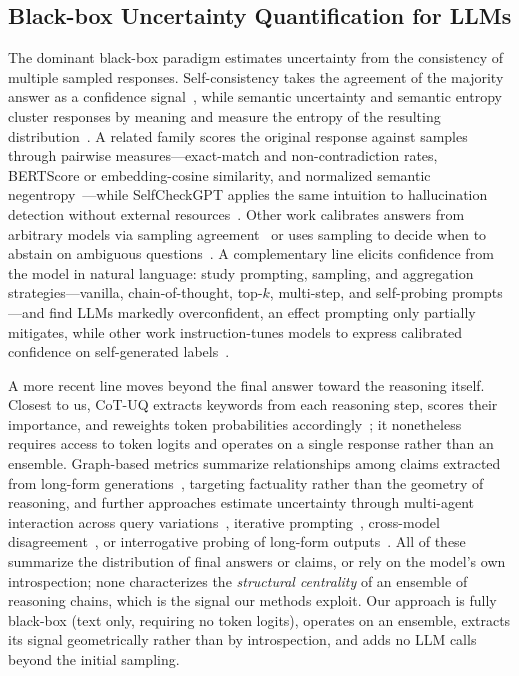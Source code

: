 \documentclass[11pt]{article}
\begin{document}
\subsection{Black-box Uncertainty Quantification for LLMs}
The dominant black-box paradigm estimates uncertainty from the consistency of
multiple sampled responses. Self-consistency takes the agreement of the majority
answer as a confidence signal~\citep{wang2023selfconsistency}, while semantic
uncertainty and semantic entropy cluster responses by meaning and measure the
entropy of the resulting distribution~\citep{kuhn2023semantic, farquhar2024detecting}.
A related family scores the original response against samples through pairwise
measures---exact-match and non-contradiction rates, BERTScore or embedding-cosine
similarity, and normalized semantic negentropy~\citep{lin2023generating}---while
SelfCheckGPT applies the same intuition to hallucination detection without
external resources~\citep{manakul2023selfcheckgpt}. Other work calibrates answers
from arbitrary models via sampling agreement~\citep{chen2024quantifying} or uses
sampling to decide when to abstain on ambiguous
questions~\citep{stelmakh2022selectively}. A complementary line elicits confidence
from the model in natural language: \citet{xiong2024llms} study prompting,
sampling, and aggregation strategies---vanilla, chain-of-thought, top-$k$,
multi-step, and self-probing prompts---and find LLMs markedly overconfident, an
effect prompting only partially mitigates, while other work instruction-tunes
models to express calibrated confidence on self-generated
labels~\citep{liu2024uait}.

A more recent line moves beyond the final answer toward the reasoning itself.
Closest to us, CoT-UQ extracts keywords from each reasoning step, scores their
importance, and reweights token probabilities accordingly~\citep{zhang2025cotuq};
it nonetheless requires access to token logits and operates on a single response
rather than an ensemble. Graph-based metrics summarize relationships among claims
extracted from long-form generations~\citep{jiang2024graphuncertainty}, targeting
factuality rather than the geometry of reasoning, and further approaches estimate
uncertainty through multi-agent interaction across query
variations~\citep{feng2025multiagent}, iterative
prompting~\citep{abbasiyadkori2024believe}, cross-model
disagreement~\citep{hamidieh2026crossmodel}, or interrogative probing of long-form
outputs~\citep{fan2026iuq}. All of these summarize the distribution of final
answers or claims, or rely on the model's own introspection; none characterizes
the \emph{structural centrality} of an ensemble of reasoning chains, which is the
signal our methods exploit. Our approach is fully black-box (text only, requiring
no token logits), operates on an ensemble, extracts its signal geometrically
rather than by introspection, and adds no LLM calls beyond the initial sampling.
\end{document}
